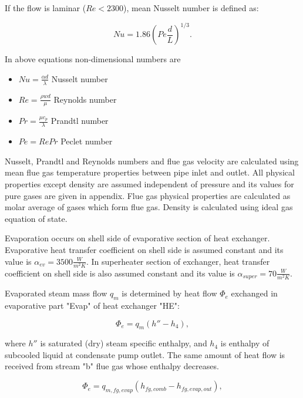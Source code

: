 \documentclass[openany]{book}
\begin{document}
	\noindent
	If the flow is laminar ($Re<2300$), mean Nusselt number is defined as:
	
	\begin{equation}\label{eq:nusselt2}
	Nu = 1.86 \left(Pe \frac{d}{L}\right)^{1/3}.
	\end{equation}
	
	\noindent
	In above equations non-dimensional numbers are
	
	\begin{itemize}
		\item $Nu = \frac{\alpha d}{\lambda}$ Nusselt number
		\item $Re = \frac{\rho w d}{\mu}$ Reynolds number
		\item $Pr = \frac{\mu c_p}{\lambda}$ Prandtl number
		\item $Pe = Re Pr$ Peclet number
	\end{itemize}
	
	\noindent
	Nusselt, Prandtl and Reynolds numbers and flue gas velocity are calculated 
	using mean flue gas temperature properties between pipe inlet and outlet. 
	All physical properties except density are assumed independent of pressure 
	and its values for pure gases are given in appendix. Flue gas physical 
	properties are calculated as molar average of gases which form flue gas. 
	Density is calculated using ideal gas equation of state.
	
	\noindent
	Evaporation occurs on shell side of evaporative section of heat exchanger. 
	Evaporative heat transfer coefficient on shell side is assumed constant and 
	its value is $\alpha_{ev}=3500 \frac{W}{m^2 K}$. In superheater section of 
	exchanger, heat transfer coefficient on shell side is also assumed constant 
	and its value is $\alpha_{super}=70 \frac{W}{m^2 K}$.
	
	Evaporated steam mass flow $q_m$ is determined by heat flow $\Phi_e$ 
	exchanged in evaporative part "Evap" of heat exchanger "HE":
	
	\begin{equation}\label{eq:evap_steam_mass}
	\Phi_e = q_m(h'' -h_4),
	\end{equation}
	
	where $h''$ is saturated (dry) steam specific enthalpy, and $h_4$ is 
	enthalpy of subcooled liquid at condensate pump outlet. 
	The same amount of heat flow is received from stream "b" flue gas whose 
	enthalpy decreases.
	
	\begin{equation}\label{eq:evap_steam_mass2}
	\Phi_e = q_{m,fg,evap} (h_{fg,comb} - h_{fg,evap,out}),
	\end{equation}
	
\end{document}
